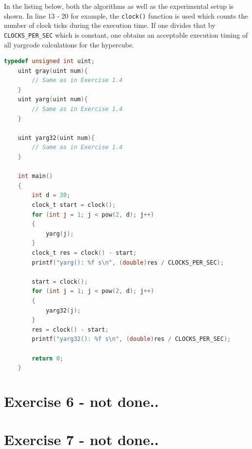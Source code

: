 \pagebreak

In the listing below, both the algorithms as well as the experimental setup is shown. In line 13 - 20 for example, the \texttt{clock()} function is used which counts the
number of clock ticks during the execution time. If one divides that by \texttt{CLOCKS\_PER\_SEC} which is constant, one obtains an acceptable execution timing of all yargcode calculations for
the hypercube.

\begin{lstlisting}[language=C, title=C Language Listing for EX1.5]
    typedef unsigned int uint;
    uint gray(uint num){
        // Same as in Exercise 1.4
    }
    uint yarg(uint num){
        // Same as in Exercise 1.4
    }
 
    uint yarg32(uint num){
        // Same as in Exercise 1.4
    }

    int main()
    {
        int d = 30;
        clock_t start = clock();
        for (int j = 1; j < pow(2, d); j++)
        {
            yarg(j);
        }
        clock_t res = clock() - start;
        printf("yarg(): %f s\n", (double)res / CLOCKS_PER_SEC);
    
        start = clock();
        for (int j = 1; j < pow(2, d); j++)
        {
            yarg32(j);
        }
        res = clock() - start;
        printf("yarg32(): %f s\n", (double)res / CLOCKS_PER_SEC);
    
        return 0;
    }
\end{lstlisting}

\pagebreak



\section{Exercise 6 - not done..}

\section{Exercise 7 - not done..}